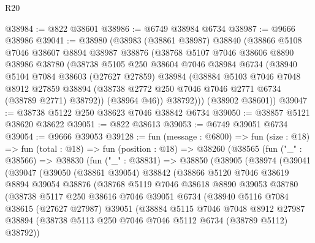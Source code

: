 \begin{lexlean}{R20}
\begin{coremodule}
{@38984 := @822 @38601
@38986 := @6749 @38984 @6734
@38987 := @9666 @38986
@39041 := @38980
    (@38983
      (@38861 @38987)
      @38840
      (@38866
        @5108
        @7046
        @38607
        @8894
        @38987
        @38876
        (@38768
          @5107
          @7046
          @38606
          @8890
          @38986
          @38780
          (@38738
            @5105
            @250
            @38604
            @7046
            @38984
            @6734
            (@38940
              @5104
              @7084
              @38603
              (@27627 @27859)
              @38984
              (@38884
                @5103
                @7046
                @7048
                @8912
                @27859
                @38894
                (@38738 @2772 @250 @7046 @7046 @2771 @6734 (@38789 @2771) @38792))
              (@38964 @46))
            @38792)))
      (@38902 @38601))
@39047 := @38738 @5122 @250 @38623 @7046 @38842 @6734
@39050 := @38857 @5121 @38620 @38622
@39051 := @822 @38613
@39053 := @6749 @39051 @6734
@39054 := @9666 @39053
@39128 := fun (message : @6800) =>
  fun (size : @18) =>
  fun (total : @18) =>
  fun (position : @18) =>
  @38260
    (@38565
      (fun ("_" : @38566) =>
      @38830
        (fun ("_" : @38831) =>
        @38850
          (@38905
            (@38974
              (@39041
                (@39047
                  (@39050
                    (@38861 @39054)
                    @38842
                    (@38866
                      @5120
                      @7046
                      @38619
                      @8894
                      @39054
                      @38876
                      (@38768
                        @5119
                        @7046
                        @38618
                        @8890
                        @39053
                        @38780
                        (@38738
                          @5117
                          @250
                          @38616
                          @7046
                          @39051
                          @6734
                          (@38940
                            @5116
                            @7084
                            @38615
                            (@27627 @27987)
                            @39051
                            (@38884
                              @5115
                              @7046
                              @7048
                              @8912
                              @27987
                              @38894
                              (@38738 @5113 @250 @7046 @7046 @5112 @6734 (@38789 @5112) @38792))
}
\end{coremodule}
\end{lexlean}
